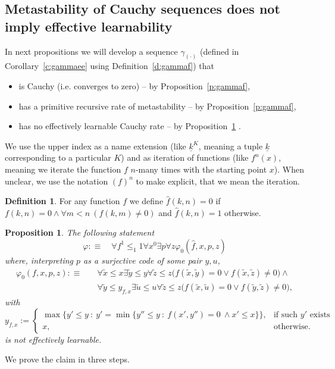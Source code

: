 \documentclass[1p]{elsarticle}
\newcommand{\tup}{\underline} %
\newcommand{\Telse}{\text{otherwise}}
\theoremstyle{plain}
\newtheorem{prop}[thm]{Proposition}
\theoremstyle{definition}
\newtheorem{dfn}[thm]{Definition}
\theoremstyle{remark}
\renewenvironment{proof}[1][]{\noindent{\bf Proof{#1}. }}{\nopagebreak[4]{\hspace*{\fill}
  $\Box$              %
 }{\vspace{2ex}}}
\renewcommand{\phi}{\varphi}
\theoremstyle{definition}
\begin{document}
{\subsection{Metastability of Cauchy sequences does not imply effective learnability}

In next propositions we will develop a sequence $\gamma_{(\cdot)}$ (defined in Corollary~\ref{c:gammaee} using Definition~\ref{d:gammaf}) that
\begin{itemize}
\item is Cauchy (i.e. converges to zero) -- by Proposition~\ref{p:gammaf},
\item has a primitive recursive rate of metastability -- by Proposition~\ref{p:gammaf},
\item has no effectively learnable Cauchy rate -- by Proposition~\ref{p:nonLearnablePhi} .
\end{itemize}

We use the upper index as a name extension (like $\tup k^K$, meaning a tuple $\tup k$ corresponding to a particular $K$) and as iteration of functions (like $f^n(x)$, meaning we iterate the function $f$ $n$-many times with the starting point $x$). When unclear, we use the notation $(f)^n$ to make explicit, that we mean the iteration.


\begin{dfn}
For any function $f$ we define $\hat f(k,n)=0$ if $f(k,n)=0\wedge\forall m<n\ (f(k,m)\neq 0)$ and $\hat f(k,n)=1$ otherwise.
\end{dfn}

\begin{prop}\label{p:nonLearnablePhi} The following statement
\[
\phi:\equiv\quad\forall f^1\leq_1 1 \forall x^0 \exists p  \forall z \phi_0 (\hat f,x,p,z)
\]
where, interpreting $p$ as a surjective code of some pair $y,u$,
\begin{align*}
\phi_0(f,x,p,z):\equiv\quad &\forall \tilde x \leq x \exists \tilde y\leq y \forall \tilde z\leq z 
\big(f(\tilde x,\tilde y)=0\vee f(\tilde x,\tilde z)\neq0\big) 
\wedge \\
&\forall \tilde y \leq y_{f,x} \exists \tilde u\leq u \forall \tilde z\leq z 
\big(f(\tilde x,\tilde u)=0\vee f(\tilde y,\tilde z)\neq0\big),
\end{align*}
with
\[
y_{f,x}:=\begin{cases}
\max\big\{y'\leq y\ :\ y'=\min\{y''\leq y\ :\ f(x',y'')=0\ \wedge x'\leq x \}\big\},&\text{if such $y'$ exists}\\
x,&\Telse.
\end{cases}
\]
is not effectively learnable.\end{prop}
\begin{proof}
We prove the claim in three steps.

\end{proof}}
\end{document}
